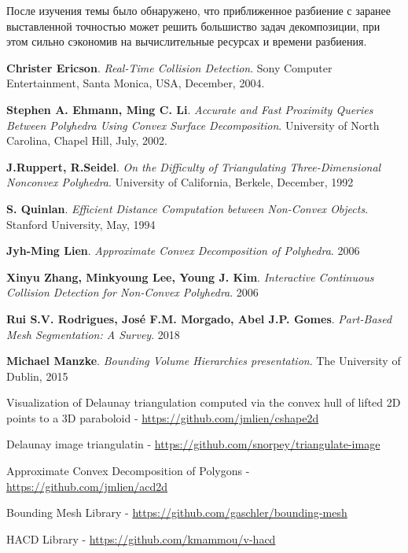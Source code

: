 \documentclass[11pt,a4paper]{extarticle}
\begin{document}
		После изучения темы было обнаружено, что приближенное разбиение с заранее выставленной точностью может решить большиство задач декомпозиции, при этом сильно сэкономив на вычислительные ресурсах и времени разбиения.
		
	

\newpage
\begin{thebibliography}{00}

	\textbf{Christer Ericson}.
	\emph{Real-Time Collision Detection}.
	Sony Computer Entertainment, Santa Monica, USA,
	December, 2004.

	\textbf{Stephen A. Ehmann, Ming C. Li}.
	\emph{Accurate and Fast Proximity Queries Between Polyhedra Using Convex Surface Decomposition}.
	University of North Carolina, Chapel Hill,
	July, 2002.

	\textbf{J.Ruppert, R.Seidel}.
	\emph{On the Difficulty of Triangulating Three-Dimensional Nonconvex Polyhedra}.
	University of California, Berkele, 
	December, 1992 

	\textbf{S. Quinlan}.
	\emph{Efficient Distance Computation between Non-Convex Objects}.
	Stanford University,
	May, 1994

	\textbf{Jyh-Ming Lien}.
	\emph{Approximate Convex Decomposition of Polyhedra}.
	2006 

	\textbf{Xinyu Zhang, Minkyoung Lee, Young J. Kim}.
	\emph{Interactive Continuous Collision Detection for Non-Convex Polyhedra}.
	2006

	\textbf{Rui S.V. Rodrigues, José F.M. Morgado, Abel J.P. Gomes}.
	\emph{Part-Based Mesh Segmentation: A Survey}.
	2018

	\textbf{Michael Manzke}.
	\emph{Bounding Volume Hierarchies presentation}.
	The University of Dublin,
	2015
	
	Visualization of Delaunay triangulation computed via the convex hull of lifted 2D points to a 3D paraboloid
		- \href{https://github.com/jmlien/cshape2d}{https://github.com/jmlien/cshape2d}

	Delaunay image triangulatin - 
	\href{https://github.com/snorpey/triangulate-image}{https://github.com/snorpey/triangulate-image}

	Approximate Convex Decomposition of Polygons - 
	\href{https://github.com/jmlien/acd2d}
	{https://github.com/jmlien/acd2d}

	Bounding Mesh Library -
	\href{https://github.com/gaschler/bounding-mesh}{https://github.com/gaschler/bounding-mesh}

	HACD Library -
	\href{https://github.com/kmammou/v-hacd}{https://github.com/kmammou/v-hacd}


\end{thebibliography}
	
\end{document}
